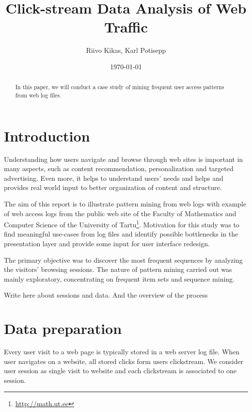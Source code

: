 \documentclass[english,a4paper]{article}
\begin{document}
\title{Click-stream Data Analysis of Web Traffic}
\author{Riivo Kikas, Karl Potisepp}
\date{\today}
\maketitle

\begin{abstract}
In  this paper, we will conduct a case study of mining frequent user access patterns from web log files.
\end{abstract}





\section{Introduction} 
Understanding how users navigate and browse through web sites is important in many aspects, such as content recommendation,
personalization and targeted advertising. Even more, it helps to understand users' needs and helps and provides real world input to better organization of content and structure.

The aim of this report is to illustrate pattern mining from web logs with example of web access logs from the public web site of the Faculty of Mathematics and Computer Science of the University of Tartu\footnote{\url{http://math.ut.ee}}. Motivation for this study was to find meaningful use-cases from log files and identify possible bottlenecks in the presentation layer and provide some input for user interface redesign. 


The primary objective was to discover the most frequent sequences by analyzing the visitors' browsing sessions. The nature of pattern mining carried out was mainly exploratory, concentrating on frequent item sets and sequence mining.

Write here about sessions and data. And the overview of the process








\section{Data preparation} 
Every user visit to a web page is typically stored in a web server log file. When user navigates on a website, all stored clicks form users clickstream. We consider user session as single visit to website and each clickstream is associated to one session.
\end{document}
